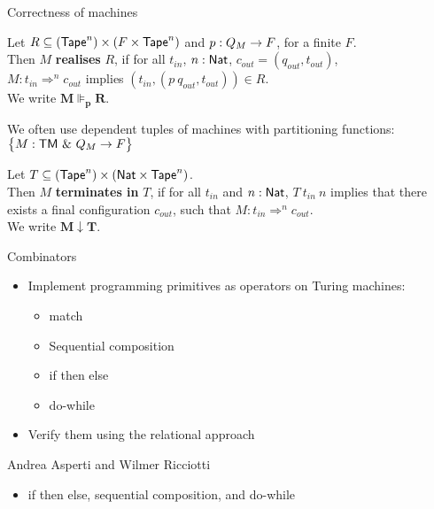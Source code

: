 \begin{frame}{Correctness of machines}
  \begin{definition}
    Let $R \subseteq (\textsf{Tape}^n) \times (F \times \textsf{Tape}^n)$ and $p : Q_M \rightarrow F$, for a finite $F$.\\
    Then $M$ \textbf{realises} $R$, if for all $t_{in}$, $n:\textsf{Nat}$, $c_{out} = (q_{out}, t_{out})$,\\
    $M: t_{in} \Rightarrow^n c_{out}$ implies $\left(t_{in}, \left(p~q_{out}, t_{out} \right) \right) \in R$.\\
    We write $\mathbf{M \VDash_p R}$.
  \end{definition}
  We often use dependent tuples of machines with partitioning functions: $\bigl\{ M : \textsf{TM}~{\&}~Q_M \rightarrow F \bigr \}$
  \pause
  \begin{definition}
    Let $T \subseteq (\textsf{Tape}^n) \times (\textsf{Nat}\times\textsf{Tape}^n)$.\\
    Then $M$ \textbf{terminates in} $T$, if for all $t_{in}$ and $n:\textsf{Nat}$, $T~t_{in}~n$ implies
    that there exists a final configuration $c_{out}$, such that $M: t_{in} \Rightarrow^n c_{out}$.\\
    We write $\mathbf{M \downarrow T}$.
  \end{definition}
\end{frame}

\begin{frame}{Combinators}
  \begin{itemize}
    \item Implement programming primitives as operators on Turing machines:
    \begin{itemize}
      \item match
      \item Sequential composition
      \item if then else
      \item do-while
    \end{itemize}
  \item Verify them using the relational approach
  \end{itemize}
  \pause
  \begin{thebibliography}{10}
    \beamertemplatearticlebibitems
    \bibitem{}
    Andrea Asperti and Wilmer Ricciotti
  \end{thebibliography}
  \begin{itemize}
    \item if then else, sequential composition, and do-while
  \end{itemize}
\end{frame}

